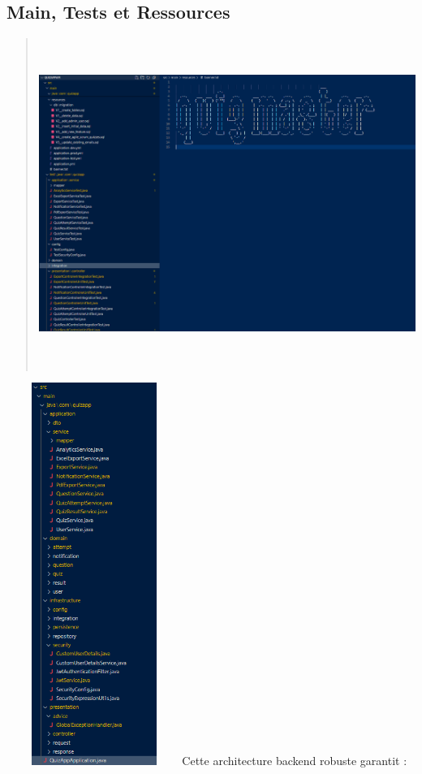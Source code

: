 \documentclass[12pt,a4paper,twoside,openright]{report}
\begin{document}
\hypertarget{main-tests-et-ressources}{%
\subsection{Main, Tests et Ressources}\label{main-tests-et-ressources}}

\begin{quote}
\includegraphics[width=5.44097in,height=4.22361in]{latex_media/media/image46.png}
\end{quote}

\includegraphics[width=2.25347in,height=4.90556in]{latex_media/media/image47.png}Cette
architecture backend robuste garantit :
\end{document}
